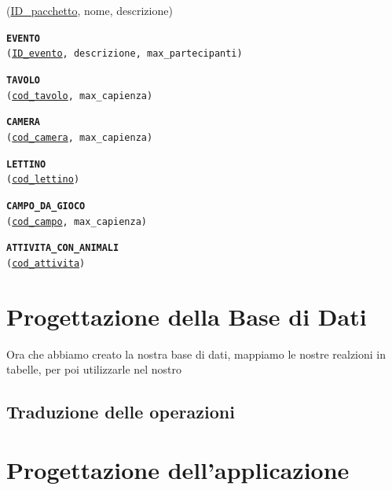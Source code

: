 \documentclass[a4paper,12pt]{report}
\begin{document}
\begin{description}
{		      (\underline{ID\_pacchetto}, nome, descrizione)}
	\item\texttt{\textbf{EVENTO} \\
		      (\underline{ID\_evento}, descrizione, max\_partecipanti)}
	\item\texttt{\textbf{TAVOLO} \\
		      (\underline{cod\_tavolo}, max\_capienza)}
	\item\texttt{\textbf{CAMERA} \\
		      (\underline{cod\_camera}, max\_capienza)}
	\item\texttt{\textbf{LETTINO} \\
		      (\underline{cod\_lettino})}
	\item\texttt{\textbf{CAMPO\_DA\_GIOCO} \\
		      (\underline{cod\_campo}, max\_capienza)}
	\item\texttt{\textbf{ATTIVITA\_CON\_ANIMALI} \\
		      (\underline{cod\_attivita})}
\end{description}

\chapter{Progettazione della Base di Dati}
Ora che abbiamo creato la nostra base di dati, mappiamo le nostre realzioni in tabelle, per poi utilizzarle nel nostro

\section{Traduzione delle operazioni}

\chapter{Progettazione dell'applicazione}
\end{document}
